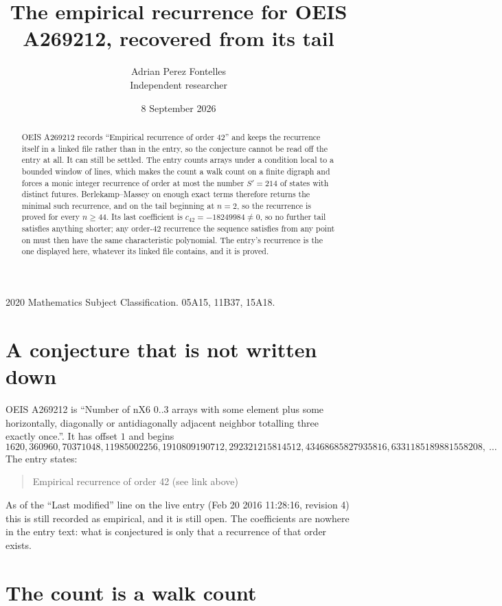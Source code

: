 \documentclass[11pt,a4paper]{article}
\title{The empirical recurrence for OEIS A269212, recovered from its tail}
\author{Adrian Perez Fontelles\\ \small Independent researcher}
\date{8 September 2026}
\theoremstyle{plain}
\theoremstyle{definition}
\begin{document}
\maketitle

\begin{abstract}
OEIS A269212 records ``Empirical recurrence of order $42$'' and keeps the recurrence itself in
a linked file rather than in the entry, so the conjecture cannot be read off the entry at all.
It can still be settled. The entry counts arrays under a condition local to a bounded window of
lines, which makes the count a walk count on a finite digraph and forces a monic integer
recurrence of order at most the number $S'=214$ of states with distinct futures. Berlekamp--Massey on
enough exact terms therefore returns the minimal such recurrence, and on the tail beginning at $n=2$, so the recurrence is proved for every $n\ge44$.
Its last coefficient is $c_{42}=-18249984\neq0$, so no further tail satisfies anything
shorter; any order-$42$ recurrence the sequence satisfies from any point on must then have
the same characteristic polynomial. The entry's recurrence is the one displayed here, whatever
its linked file contains, and it is proved.
\end{abstract}

\noindent\small 2020 Mathematics Subject Classification. 05A15, 11B37, 15A18.\normalsize

\section{A conjecture that is not written down}

OEIS A269212 is ``Number of nX6 0..3 arrays with some element plus some horizontally, diagonally or antidiagonally adjacent neighbor totalling three exactly once.''. It has offset $1$ and begins
\[
1620, 360960, 70371048, 11985002256, 1910809190712, 292321215814512, 43468685827935816, 6331185189881558208,\ \dots
\]
The entry states:
\begin{quote}
Empirical recurrence of order 42 (see link above)
\end{quote}
As of the ``Last modified'' line on the live entry (Feb 20 2016 11:28:16, revision 4)
this is still recorded as empirical, and it is still open. The coefficients are nowhere in the
entry text: what is conjectured is only that a recurrence of that order exists.

\section{The count is a walk count}
\end{document}
